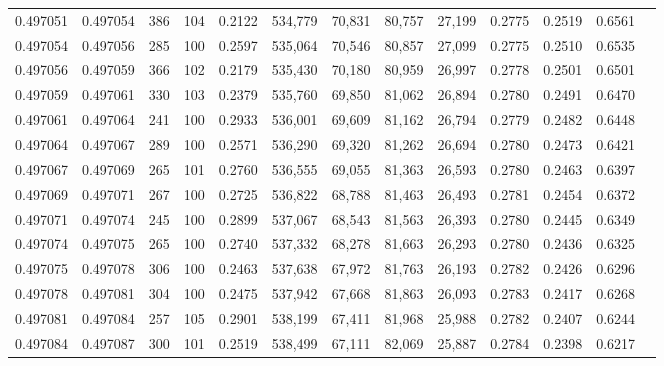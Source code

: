 \begin{tabular}{rrrrrrrrrrrrr}
0.497051 & 0.497054 &   386 & 104 &                                     0.2122 & 534,779 &  70,831 &  80,757 &  27,199 & 0.2775 & 0.2519 & 0.6561 \\
0.497054 & 0.497056 &   285 & 100 &                                     0.2597 & 535,064 &  70,546 &  80,857 &  27,099 & 0.2775 & 0.2510 & 0.6535 \\
0.497056 & 0.497059 &   366 & 102 &                                     0.2179 & 535,430 &  70,180 &  80,959 &  26,997 & 0.2778 & 0.2501 & 0.6501 \\
0.497059 & 0.497061 &   330 & 103 &                                     0.2379 & 535,760 &  69,850 &  81,062 &  26,894 & 0.2780 & 0.2491 & 0.6470 \\
0.497061 & 0.497064 &   241 & 100 &                                     0.2933 & 536,001 &  69,609 &  81,162 &  26,794 & 0.2779 & 0.2482 & 0.6448 \\
0.497064 & 0.497067 &   289 & 100 &                                     0.2571 & 536,290 &  69,320 &  81,262 &  26,694 & 0.2780 & 0.2473 & 0.6421 \\
0.497067 & 0.497069 &   265 & 101 &                                     0.2760 & 536,555 &  69,055 &  81,363 &  26,593 & 0.2780 & 0.2463 & 0.6397 \\
0.497069 & 0.497071 &   267 & 100 &                                     0.2725 & 536,822 &  68,788 &  81,463 &  26,493 & 0.2781 & 0.2454 & 0.6372 \\
0.497071 & 0.497074 &   245 & 100 &                                     0.2899 & 537,067 &  68,543 &  81,563 &  26,393 & 0.2780 & 0.2445 & 0.6349 \\
0.497074 & 0.497075 &   265 & 100 &                                     0.2740 & 537,332 &  68,278 &  81,663 &  26,293 & 0.2780 & 0.2436 & 0.6325 \\
0.497075 & 0.497078 &   306 & 100 &                                     0.2463 & 537,638 &  67,972 &  81,763 &  26,193 & 0.2782 & 0.2426 & 0.6296 \\
0.497078 & 0.497081 &   304 & 100 &                                     0.2475 & 537,942 &  67,668 &  81,863 &  26,093 & 0.2783 & 0.2417 & 0.6268 \\
0.497081 & 0.497084 &   257 & 105 &                                     0.2901 & 538,199 &  67,411 &  81,968 &  25,988 & 0.2782 & 0.2407 & 0.6244 \\
0.497084 & 0.497087 &   300 & 101 &                                     0.2519 & 538,499 &  67,111 &  82,069 &  25,887 & 0.2784 & 0.2398 & 0.6217 \\

\end{tabular}
